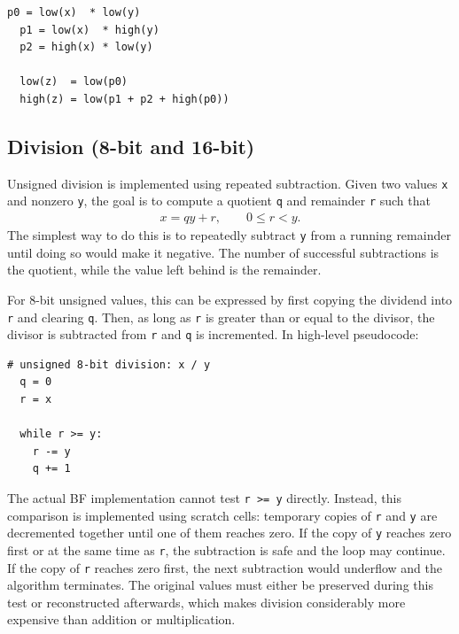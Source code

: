 \vspace{0.5cm}\noindent\begin{minipage}{\linewidth}
\begin{lstlisting}[style=pseudocode]
  p0 = low(x)  * low(y)
  p1 = low(x)  * high(y)
  p2 = high(x) * low(y)

  low(z)  = low(p0)
  high(z) = low(p1 + p2 + high(p0))
\end{lstlisting}
\end{minipage}


\subsection{Division (8-bit and 16-bit)}
\label{sec:compilation:division}
Unsigned division is implemented using repeated subtraction. Given two values \texttt{x} and nonzero \texttt{y}, the goal is to compute a quotient \texttt{q} and remainder \texttt{r} such that
%
\begin{align}
x = qy + r, \qquad 0 \leq r < y.
\end{align}
%
The simplest way to do this is to repeatedly subtract \texttt{y} from a running remainder until doing so would make it negative. The number of successful subtractions is the quotient, while the value left behind is the remainder.

For 8-bit unsigned values, this can be expressed by first copying the dividend into \texttt{r} and clearing \texttt{q}. Then, as long as \texttt{r} is greater than or equal to the divisor, the divisor is subtracted from \texttt{r} and \texttt{q} is incremented. In high-level pseudocode:

\vspace{0.5cm}\noindent\begin{minipage}{\linewidth}
\begin{lstlisting}[style=pseudocode]
  # unsigned 8-bit division: x / y
  q = 0
  r = x

  while r >= y:
    r -= y
    q += 1
\end{lstlisting}
\end{minipage}

The actual BF implementation cannot test \texttt{r >= y} directly. Instead, this comparison is implemented using scratch cells: temporary copies of \texttt{r} and \texttt{y} are decremented together until one of them reaches zero. If the copy of \texttt{y} reaches zero first or at the same time as \texttt{r}, the subtraction is safe and the loop may continue. If the copy of \texttt{r} reaches zero first, the next subtraction would underflow and the algorithm terminates. The original values must either be preserved during this test or reconstructed afterwards, which makes division considerably more expensive than addition or multiplication.

